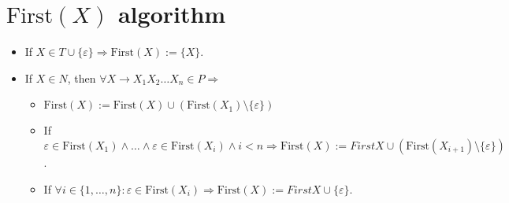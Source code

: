 \documentclass[8pt]{scrartcl}
\newcommand{\First}[1]{\mathrm{First}(#1)}
\newcommand{\epsset}{\{\varepsilon\}}
\begin{document}
    \section{$\First{X}$ algorithm}
        \begin{itemize}
            \item If $X \in T\cup \epsset \Rightarrow \First{X} := \{ X \}$.
            \item If $X \in N$, then $\forall X \rightarrow X_1 X_2 \dots X_n \in P \Rightarrow$
                \begin{itemize}
                    \item $\First{X} := \First{X} \cup \left(\First{X_1} \setminus \epsset\right)$
                    \item If $\varepsilon \in \First{X_1} \wedge \dots \wedge \varepsilon \in \First{X_i} \wedge i<n \Rightarrow \First{X} := First{X} \cup \left(\First{X_{i+1}} \setminus \epsset\right)$.
                    \item If $\forall i \in \{1, \dots, n\}\colon \varepsilon \in \First{X_i} \Rightarrow \First{X} := First{X} \cup \epsset$.
                \end{itemize}
        \end{itemize}
\end{document}
